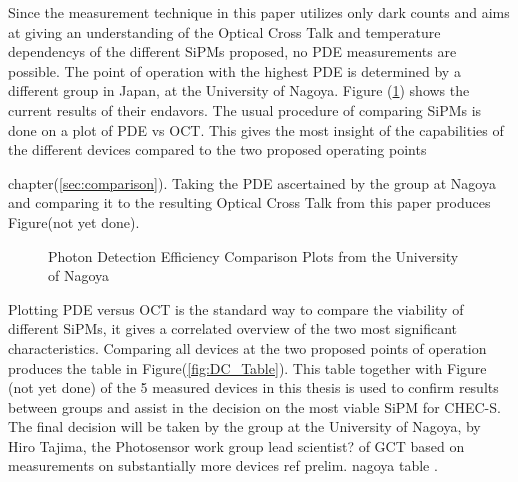 \documentclass[12pt,article,type=msc,colorback,accentcolor=tud9c]{tudthesis}
\begin{document}
Since the measurement technique in this paper utilizes only dark counts and aims at giving an understanding of the Optical Cross Talk and temperature dependencys of the different SiPMs proposed, no PDE measurements are possible. The point of operation with the highest PDE is determined by a different group in Japan, at the University of Nagoya. Figure (\ref{fig:Nagoya_PDE}) shows the current results of their endavors. The usual procedure of comparing SiPMs is done on a plot of PDE vs OCT. This gives the most insight of the capabilities of the different devices compared to the two proposed operating points {chapter(\ref{sec:comparison}). Taking the PDE ascertained by the group at Nagoya and comparing it to the resulting Optical Cross Talk from this paper produces \\
Figure(not yet done). 


\begin{figure}[h]
\begin{centering}
\caption{Photon Detection Efficiency Comparison Plots from the University of Nagoya}
\label{fig:Nagoya_PDE}
\end{centering}
\end{figure}

Plotting PDE versus OCT is the standard way to compare the viability of different SiPMs, it gives a correlated overview of the two most significant characteristics. Comparing all devices at the two proposed points of operation produces the table in Figure(\ref{fig:DC_Table}). This table together with Figure (not yet done) of the 5 measured devices in this thesis is used to confirm results between groups and assist in the decision on the most viable SiPM for CHEC-S. The final decision will be taken by the group at the University of Nagoya, by Hiro Tajima, the Photosensor work group lead scientist? of GCT based on measurements on substantially more devices ref {prelim. nagoya table} .

}
\end{document}
